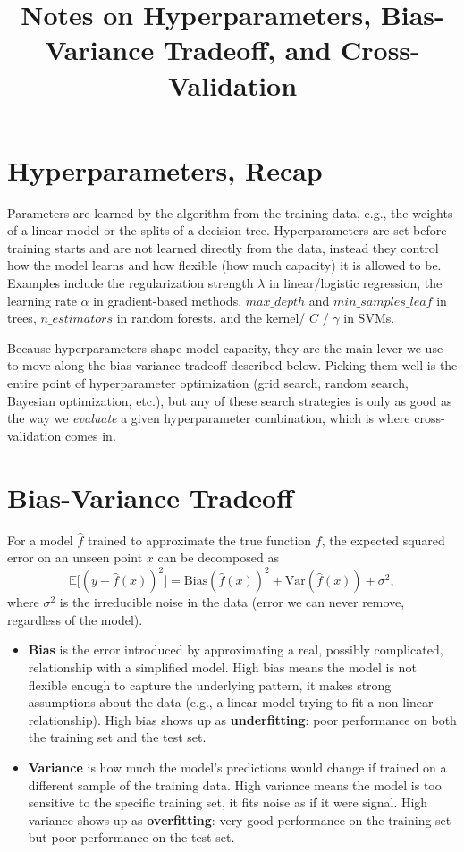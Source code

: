 \documentclass[conference]{IEEEtran}
\title{Notes on Hyperparameters, Bias-Variance Tradeoff, and Cross-Validation}
\author{
\IEEEauthorblockN{Luis Mendez}
}
\begin{document}
\maketitle

\section*{Hyperparameters, Recap}
Parameters are learned by the algorithm from the training data, e.g., the weights of a linear model or the splits of a decision tree. Hyperparameters are set before training starts and are not learned directly from the data, instead they control how the model learns and how flexible (how much capacity) it is allowed to be. Examples include the regularization strength $\lambda$ in linear/logistic regression, the learning rate $\alpha$ in gradient-based methods, $max\_depth$ and $min\_samples\_leaf$ in trees, $n\_estimators$ in random forests, and the kernel/ $C$ / $\gamma$ in SVMs.

Because hyperparameters shape model capacity, they are the main lever we use to move along the bias-variance tradeoff described below. Picking them well is the entire point of hyperparameter optimization (grid search, random search, Bayesian optimization, etc.), but any of these search strategies is only as good as the way we \textit{evaluate} a given hyperparameter combination, which is where cross-validation comes in.

\section*{Bias-Variance Tradeoff}
For a model $\hat{f}$ trained to approximate the true function $f$, the expected squared error on an unseen point $x$ can be decomposed as
\begin{equation}
    \mathbb{E}\big[(y - \hat{f}(x))^2\big] = \text{Bias}(\hat{f}(x))^2 + \text{Var}(\hat{f}(x)) + \sigma^2,
\end{equation}
where $\sigma^2$ is the irreducible noise in the data (error we can never remove, regardless of the model).

\begin{itemize}
    \item \textbf{Bias} is the error introduced by approximating a real, possibly complicated, relationship with a simplified model. High bias means the model is not flexible enough to capture the underlying pattern, it makes strong assumptions about the data (e.g., a linear model trying to fit a non-linear relationship). High bias shows up as \textbf{underfitting}: poor performance on both the training set and the test set.
    \item \textbf{Variance} is how much the model's predictions would change if trained on a different sample of the training data. High variance means the model is too sensitive to the specific training set, it fits noise as if it were signal. High variance shows up as \textbf{overfitting}: very good performance on the training set but poor performance on the test set.
\end{itemize}
\end{document}
